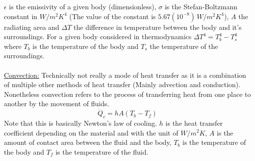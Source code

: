 \documentclass[11pt, a4paper]{article}
\begin{document}
$\epsilon$ is the emissivity of a given body (dimensionless), $\sigma$ is the Stefan-Boltzmann constant in $W/m^2K^4$ (The value of the constant is $5.67(10^{-8})\,W/m^2K^4$), $A$ the radiating area and $\Delta T$ the difference in temperature between the body and it's surroundings. For a given body considered in thermodynamics $\Delta T^4 = T_b^4 - T_s^4$ where $T_b$ is the temperature of the body and $T_s$ the temperature of the surroundings.\\
\\
\underline{Convection:}
Technically not really a mode of heat transfer as it is a combination of multiple other methods of heat transfer (Mainly advection and conduction). Nonetheless convection refers to the process of transferring heat from one place to another by the movement of fluids.
\begin{equation}
  \dot{Q}_c = hA(T_b - T_f)
\end{equation}
Note that this is basically Newton's law of cooling. $h$ is the heat transfer coefficient depending on the material and with the unit of $W/m^2K$, $A$ is the amount of contact area between the fluid and the body, $T_b$ is the temperature of the body and $T_f$ is the temperature of the fluid. 
\end{document}
